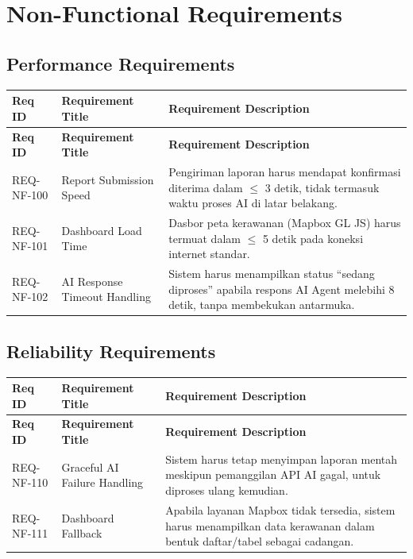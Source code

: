 \documentclass[11pt,a4paper]{article}
\begin{document}
\newpage

\section{Non-Functional Requirements}

\subsection{Performance Requirements}
\begin{longtable}{|L{2.4cm}|L{4.2cm}|L{7.2cm}|}
\hline
{}\textbf{Req ID} & \textbf{Requirement Title} & \textbf{Requirement Description} \\ \hline
\endfirsthead
\hline
{}\textbf{Req ID} & \textbf{Requirement Title} & \textbf{Requirement Description} \\ \hline
\endhead
REQ-NF-100 & Report Submission Speed & Pengiriman laporan harus mendapat konfirmasi diterima dalam $\leq$ 3 detik, tidak termasuk waktu proses AI di latar belakang. \\ \hline
REQ-NF-101 & Dashboard Load Time & Dasbor peta kerawanan (Mapbox GL JS) harus termuat dalam $\leq$ 5 detik pada koneksi internet standar. \\ \hline
REQ-NF-102 & AI Response Timeout Handling & Sistem harus menampilkan status ``sedang diproses'' apabila respons AI Agent melebihi 8 detik, tanpa membekukan antarmuka. \\ \hline
\end{longtable}

\subsection{Reliability Requirements}
\begin{longtable}{|L{2.4cm}|L{4.2cm}|L{7.2cm}|}
\hline
{}\textbf{Req ID} & \textbf{Requirement Title} & \textbf{Requirement Description} \\ \hline
\endfirsthead
\hline
{}\textbf{Req ID} & \textbf{Requirement Title} & \textbf{Requirement Description} \\ \hline
\endhead
REQ-NF-110 & Graceful AI Failure Handling & Sistem harus tetap menyimpan laporan mentah meskipun pemanggilan API AI gagal, untuk diproses ulang kemudian. \\ \hline
REQ-NF-111 & Dashboard Fallback & Apabila layanan Mapbox tidak tersedia, sistem harus menampilkan data kerawanan dalam bentuk daftar/tabel sebagai cadangan. \\ \hline
\end{longtable}
\end{document}

